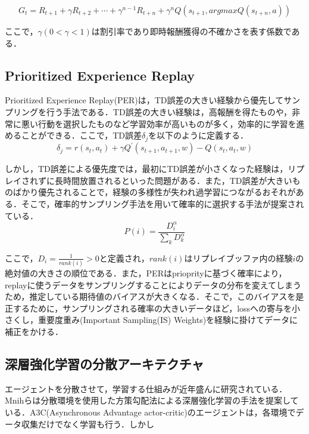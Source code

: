 \documentclass[12pt]{sonota/aislab}
\begin{document}
\begin{equation}
\label{multi-step}
G_{t}=R_{t+1}+\gamma R_{t+2}+\cdots+\gamma^{n-1}R_{t+n}+\gamma^n Q(s_{t+1},argmaxQ(s_{t+n},a))
\end{equation}

ここで，$\gamma(0<\gamma<1)$は割引率であり即時報酬獲得の不確かさを表す係数である．
\subsection{Prioritized Experience Replay}
Prioritized Experience Replay(PER)は，TD誤差の大きい経験から優先してサンプリングを行う手法である\cite{prioritized}．TD誤差の大きい経験は，高報酬を得たものや，非常に悪い行動を選択したものなど学習効率が高いものが多く，効率的に学習を進めることができる．ここで，TD誤差$\delta_{j}$を以下のように定義する．
\begin{equation}
\label{TD_error}
  \delta_{j}=r(s_{t},a_{t})+\gamma Q^{\prime}(s_{t+1},a_{t+1},w)-Q(s_{t},a_{t},w)
\end{equation}

しかし，TD誤差による優先度では，最初にTD誤差が小さくなった経験は，リプレイされずに長時間放置されるといった問題がある．また，TD誤差が大きいものばかり優先されることで，経験の多様性が失われ過学習につながるおそれがある．そこで，確率的サンプリング手法を用いて確率的に選択する手法が提案されている．
\begin{equation}
\label{sum_P_i}
  P(i)=\frac{D_{i}^{\alpha}}{\sum_{k}D_{k}^{\alpha}}
\end{equation}

ここで，$D_{i}=\frac{1}{rank(i)}>0$と定義され，$rank(i)$はリプレイブッファ内の経験$i$の絶対値の大きさの順位である．また，PERはprioprityに基づく確率により，replayに使うデータをサンプリングすることによりデータの分布を変えてしまうため，推定している期待値のバイアスが大きくなる．そこで，このバイアスを是正するために，サンプリングされる確率の大きいデータほど，lossへの寄与を小さくし，重要度重み(Important Sampling(IS) Weights)を経験に掛けてデータに補正をかける．

\subsection{深層強化学習の分散アーキテクチャ}
エージェントを分散させて，学習する仕組みが近年盛んに研究されている\cite{A3C}\cite{Gorila}\cite{Ape-X}．Mnihらは分散環境を使用した方策勾配法による深層強化学習の手法を提案している\cite{A3C}．A3C(Asynchronous Advantage actor-critic)のエージェントは，各環境でデータ収集だけでなく学習も行う．しかし
\end{document}

